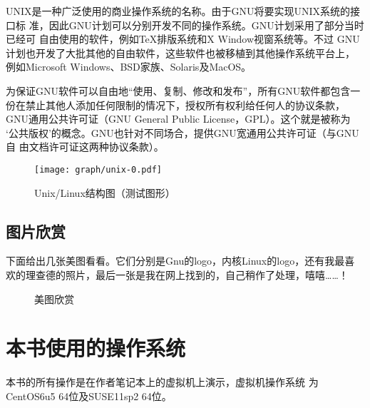 UNIX是一种广泛使用的商业操作系统的名称。由于GNU将要实现UNIX系统的接口标
准，因此GNU计划可以分别开发不同的操作系统。GNU计划采用了部分当时已经可
自由使用的软件，例如\TeX\index{\TeX}排版系统和X Window视窗系统等。不过
GNU计划也开发了大批其他的自由软件，这些软件也被移植到其他操作系统平台上，
例如Microsoft Windows、BSD家族、Solaris及MacOS。

为保证GNU软件可以自由地“使用、复制、修改和发布”，所有GNU软件都包含一
份在禁止其他人添加任何限制的情况下，授权所有权利给任何人的协议条款，
GNU通用公共许可证（GNU General Public License，GPL）。这个就是被称为
‘公共版权’的概念。GNU也针对不同场合，提供GNU宽通用公共许可证（与GNU自
  由文档许可证这两种协议条款）\cite{Kline}。

\begin{figure}[!htbp]
  \centering
  \texttt{[image: graph/unix-0.pdf]}
  \caption{Unix/Linux结构图（测试图形）}
  \label{fig:UnixTopo}
\end{figure}

\subsection{图片欣赏}
\label{subsec:picView}

下面给出几张美图看看。它们分别是Gnu的logo，内核Linux的logo，还有我最喜
欢的理查德的照片，最后一张是我在网上找到的，自己稍作了处理，嘻嘻……！

\begin{figure}[!htbp]
  \centering
  \hspace{30pt}
  \vspace{10pt}
  \caption{美图欣赏}
  \label{fig:meituxinshang}
\end{figure}

\section{本书使用的操作系统}
\label{sec:thisOS}

本书的所有操作是在作者笔记本上的虚拟机上演示，虚拟机操作系统
为CentOS6u5 64位及SUSE11sp2 64位。


